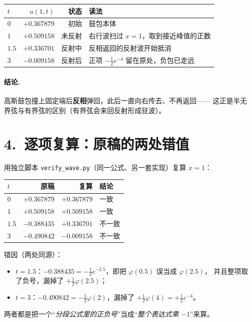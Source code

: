 \documentclass[11pt,a4paper]{ctexart}
\newcommand{\vp}{\varphi}
\newcommand{\warn}[1]{\textcolor{red!75!black}{#1}}
\begin{document}
\begin{center}
\begin{tabular}{lrrl}
\toprule
$t$ & $u(1,t)$ & 状态 & 读法 \\
\midrule
$0$   & $+0.367879$ & 初始 & 鼓包本体 \\
$1$   & $+0.509158$ & 未反射 & 右行波扫过 $x=1$，取到接近峰值的正数 \\
$1.5$ & $+0.336701$ & 反射中 & 反相返回的反射波开始抵消 \\
$3$   & $-0.009158$ & 反射后 & 正项 $-\tfrac12 e^{-4}$ 留在原处，负包已走远 \\
\bottomrule
\end{tabular}
\end{center}

\paragraph{结论.}
高斯鼓包撞上固定端后\textbf{反相}弹回，此后一直向右传去、不再返回——
这正是半无界弦与有界弦的区别（有界弦会来回反射形成驻波）。

\section*{4.\ 逐项复算：原稿的两处错值}

用独立脚本 \texttt{verify\_wave.py}（同一公式、另一套实现）复算 $x=1$：
\begin{center}
\begin{tabular}{lrrl}
\toprule
$t$ & 原稿 & 复算 & 结论 \\
\midrule
$0$   & $+0.367879$ & $+0.367879$ & 一致 \\
$1$   & $+0.509158$ & $+0.509158$ & 一致 \\
$1.5$ & $-0.388435$ & $+0.336701$ & \warn{不一致} \\
$3$   & $-0.490842$ & $-0.009158$ & \warn{不一致} \\
\bottomrule
\end{tabular}
\end{center}

\noindent 错因（两处同源）：
\begin{itemize}[leftmargin=1.6em,itemsep=1pt]
  \item $t=1.5$：$-0.388435=-\tfrac12 e^{-2.5}$，即把 $\vp(0.5)$ 误当成 $\vp(2.5)$，
        并且整项取了负号，漏掉了 $+\tfrac12\vp(2.5)$；
  \item $t=3$：$-0.490842=-\tfrac12\vp(2)$，漏掉了 $+\tfrac12\vp(4)=+\tfrac12 e^{-4}$。
\end{itemize}
两者都是把一个“\emph{分段公式里的正负号}”当成“\emph{整个表达式乘 $-1$}”来算。
\end{document}
